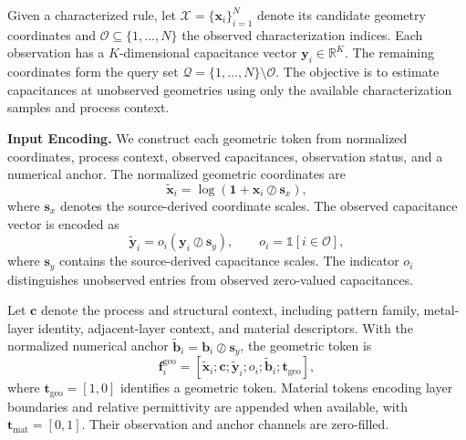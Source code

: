 \documentclass[conference,9pt,letterpaper]{IEEEtran}
\begin{document}
Given a characterized rule, let
$\mathcal{X}=\{\mathbf{x}_i\}_{i=1}^{N}$ denote its
candidate geometry coordinates and
$\mathcal{O}\subseteq\{1,\ldots,N\}$ the observed
characterization indices. Each observation has a
$K$-dimensional capacitance vector
$\mathbf{y}_i\in\mathbb{R}^{K}$.
The remaining coordinates form the query set
$\mathcal{Q}=\{1,\ldots,N\}\setminus\mathcal{O}$.
The objective is to estimate capacitances at
unobserved geometries using only the available
characterization samples and process context.

\textbf{Input Encoding.}
We construct each geometric token from normalized
coordinates, process context, observed capacitances,
observation status, and a numerical anchor.
The normalized geometric coordinates are
\begin{equation}
\widetilde{\mathbf{x}}_i
=
\log\left(
\mathbf{1}+\mathbf{x}_i\oslash\mathbf{s}_x
\right),
\end{equation}
where $\mathbf{s}_x$ denotes the source-derived
coordinate scales. The observed capacitance vector
is encoded as
\begin{equation}
\widetilde{\mathbf{y}}_i
=
o_i(\mathbf{y}_i\oslash\mathbf{s}_y),
\qquad
o_i=\mathbb{1}[i\in\mathcal{O}],
\end{equation}
where $\mathbf{s}_y$ contains the source-derived
capacitance scales. The indicator $o_i$ distinguishes
unobserved entries from observed zero-valued
capacitances.

Let $\mathbf{c}$ denote the process and structural
context, including pattern family, metal-layer
identity, adjacent-layer context, and material
descriptors. With the normalized numerical anchor
$\widetilde{\mathbf{b}}_i=\mathbf{b}_i\oslash\mathbf{s}_y$,
the geometric token is
\begin{equation}
\mathbf{f}_i^{\mathrm{geo}}
=
[
\widetilde{\mathbf{x}}_i;
\mathbf{c};
\widetilde{\mathbf{y}}_i;
o_i;
\widetilde{\mathbf{b}}_i;
\mathbf{t}_{\mathrm{geo}}
],
\label{eq:input_token}
\end{equation}
where $\mathbf{t}_{\mathrm{geo}}=[1,0]$ identifies
a geometric token. Material tokens encoding layer
boundaries and relative permittivity are appended
when available, with $\mathbf{t}_{\mathrm{mat}}=[0,1]$.
Their observation and anchor channels are zero-filled.
\end{document}
